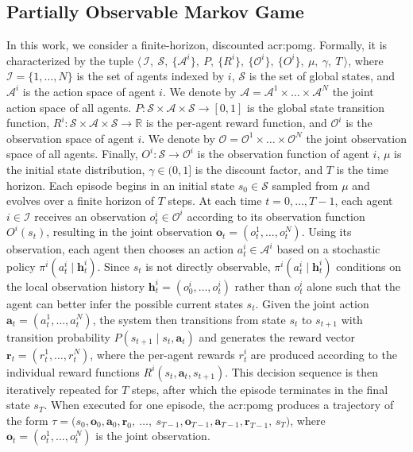 \subsection{Partially Observable Markov Game}
\label{sec:pomg}
In this work, we consider a finite-horizon, discounted \gls{acr:pomg}. Formally, it is characterized by the tuple \mbox{$\big\langle\, \mathcal{I},\ \mathcal{S},\ \{\mathcal{A}^i\},\ P,\ \{R^i\},\ \{\mathcal{O}^i\},\ \{O^i\},\ \mu,\ \gamma,\ T \,\big\rangle$},
where $\mathcal{I}=\{1,\dots,N\}$ is the set of agents indexed by $i$, $\mathcal{S}$ is the set of global states, and $\mathcal{A}^i$ is the action space of agent $i$. We denote by $\mathcal{A} = \mathcal{A}^1\times\dots\times\mathcal{A}^N$ the joint action space of all agents. $P:\mathcal{S}\times\mathcal{A}\times\mathcal{S}\to[0,1]$ is the global state transition function, $R^i:\mathcal{S}\times\mathcal{A}\times\mathcal{S}\to\mathbb{R}$ is the per-agent reward function, and $\mathcal{O}^i$ is the observation space of agent $i$. We denote by $\mathcal{O}=\mathcal{O}^1\times\dots\times\mathcal{O}^N$ the joint observation space of all agents. Finally, $O^i:\mathcal{S}\to\mathcal{O}^i$ is the observation function of agent $i$, $\mu$ is the initial state distribution, $\gamma\in(0,1]$ is the discount factor, and $T$ is the time horizon. Each episode begins in an initial state $s_0\in\mathcal{S}$ sampled from $\mu$ and evolves over a finite horizon of $T$ steps. At each time $t=0,\dots,T-1$, each agent $i\in \mathcal{I}$ receives an observation $o^i_t\in\mathcal{O}^i$ according to its observation function $O^i(s_t)$, resulting in the joint observation $\mathbf{o}_t=(o_t^1,\dots,o_t^N)$. Using its observation, each agent then chooses an action $a^i_t\in\mathcal{A}^i$ based on a stochastic policy $\pi^i(a^i_t \mid \mathbf{h}^i_t)$. Since $s_t$ is not directly observable, $\pi^i(a^i_t \mid \mathbf{h}^i_t)$ conditions on the local observation history $\mathbf{h}^i_t = (o^i_0, \dots, o^i_t)$ rather than $o^i_t$ alone such that the agent can better infer the possible current states $s_t$. Given the joint action $\mathbf{a}_t=(a_t^1,\dots,a_t^N)$, the system then transitions from state $s_t$ to $s_{t+1}$ with transition probability $P(s_{t+1}\mid s_t,\mathbf{a}_t)$ and generates the reward vector $\mathbf{r}_t = (r_t^1,\dots,r_t^N)$, where the per-agent rewards $r_t^i$ are produced according to the individual reward functions $R^i(s_t, \mathbf{a}_t, s_{t+1})$. This decision sequence is then iteratively repeated for $T$ steps, after which the episode terminates in the final state $s_T$. When executed for one episode, the \gls{acr:pomg} produces a trajectory of the form $\tau = \big(s_0, \mathbf{o}_0, \mathbf{a}_0, \mathbf{r}_0,\ \dots,\ s_{T-1}, \mathbf{o}_{T-1}, \mathbf{a}_{T-1}, \mathbf{r}_{T-1},\, s_T\big)$, where $\mathbf{o}_t=(o_t^1,\dots,o_t^N)$ is the joint observation.\\ 


